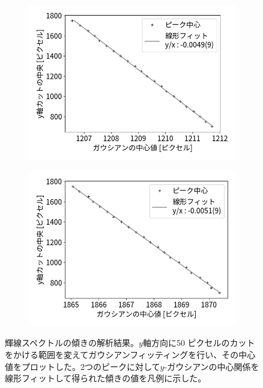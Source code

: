 \documentclass[a4paper,11pt,uplatex]{jsbook}
\begin{document}
\begin{figure}[h]
\begin{subfigure}[h]{0.3\linewidth}
    \includegraphics[width=\linewidth]{image/4-tiltfpeak.png}
  \end{subfigure}
  \hfill
  \begin{subfigure}[h]{0.3\linewidth}
    \centering
    \includegraphics[width=\linewidth]{image/4-tiltspeak.png}
  \end{subfigure}
  \caption[水銀灯の波長較正-3]{輝線スペクトルの傾きの解析結果。$y$軸方向に50 ピクセルのカットをかける範囲を変えてガウシアンフィッティングを行い、その中心値をプロットした。2つのピークに対して$y$-ガウシアンの中心関係を線形フィットして得られた傾きの値を凡例に示した。}\label{tiltfit}
\end{figure}
\end{document}
